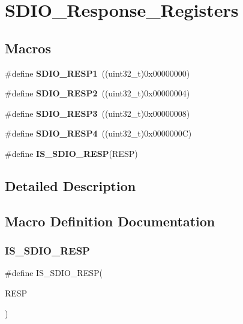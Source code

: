 \section{S\+D\+I\+O\+\_\+\+Response\+\_\+\+Registers}
\label{group__SDIO__Response__Registers}
\subsection*{Macros}
\begin{DoxyCompactItemize}
\item 
\#define \textbf{ S\+D\+I\+O\+\_\+\+R\+E\+S\+P1}~((uint32\+\_\+t)0x00000000)
\item 
\#define \textbf{ S\+D\+I\+O\+\_\+\+R\+E\+S\+P2}~((uint32\+\_\+t)0x00000004)
\item 
\#define \textbf{ S\+D\+I\+O\+\_\+\+R\+E\+S\+P3}~((uint32\+\_\+t)0x00000008)
\item 
\#define \textbf{ S\+D\+I\+O\+\_\+\+R\+E\+S\+P4}~((uint32\+\_\+t)0x0000000\+C)
\item 
\#define \textbf{ I\+S\+\_\+\+S\+D\+I\+O\+\_\+\+R\+E\+SP}(R\+E\+SP)
\end{DoxyCompactItemize}


\subsection{Detailed Description}


\subsection{Macro Definition Documentation}
\mbox{\label{group__SDIO__Response__Registers_gaea6a7f75a5e677d50ba5c9ae2d3a7839}} 
\subsubsection{I\+S\+\_\+\+S\+D\+I\+O\+\_\+\+R\+E\+SP}
{\footnotesize\ttfamily \#define I\+S\+\_\+\+S\+D\+I\+O\+\_\+\+R\+E\+SP(\begin{DoxyParamCaption}\item[{}]{R\+E\+SP }\end{DoxyParamCaption})}

